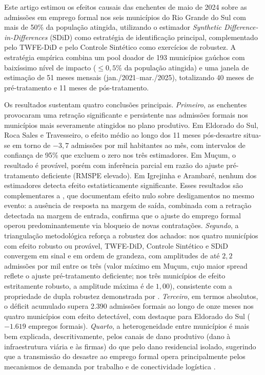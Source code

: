 \documentclass[a4paper,12pt]{article}
\begin{document}
Este artigo estimou os efeitos causais das enchentes de maio de 2024 sobre as admissões
em emprego formal nos seis municípios do Rio Grande do Sul com mais de 50\% da
população atingida, utilizando o estimador \textit{Synthetic Difference-in-Differences}
(SDiD) como estratégia de identificação principal, complementado pelo TWFE-DiD e pelo
Controle Sintético como exercícios de robustez. A estratégia empírica combina um pool
doador de 193 municípios gaúchos com baixíssimo nível de impacto ($\leq 0{,}5\%$ da
população atingida) e uma janela de estimação de 51 meses mensais (jan./2021–mar./2025),
totalizando 40 meses de pré-tratamento e 11 meses de pós-tratamento.

Os resultados sustentam quatro conclusões principais. \emph{Primeiro}, as enchentes
provocaram uma retração significante e persistente nas admissões formais nos municípios
mais severamente atingidos no plano produtivo. Em Eldorado do Sul, Roca Sales e
Travesseiro, o efeito médio ao longo dos 11 meses pós-desastre situa-se em torno de
$-3{,}7$ admissões por mil habitantes ao mês, com intervalos de confiança de 95\% que
excluem o zero nos três estimadores. Em Muçum, o resultado é provável, porém com
inferência parcial em razão do ajuste pré-tratamento deficiente (RMSPE elevado). Em
Igrejinha e Arambaré, nenhum dos estimadores detecta efeito estatisticamente significante.
Esses resultados são complementares a , que documentam efeito
nulo sobre desligamentos no mesmo evento: a ausência de resposta na margem de saída,
combinada com a retração detectada na margem de entrada, confirma que o ajuste do
emprego formal operou predominantemente via bloqueio de novas contratações.
\emph{Segundo}, a triangulação metodológica reforça a robustez dos achados: nos quatro
municípios com efeito robusto ou provável, TWFE-DiD, Controle Sintético e SDiD convergem
em sinal e em ordem de grandeza, com amplitudes de até $2{,}2$ admissões por mil entre os três
(valor máximo em Muçum, cujo maior spread reflete o ajuste pré-tratamento
deficiente; nos três municípios de efeito estritamente robusto, a amplitude
máxima é de $1{,}00$), consistente com a propriedade de dupla robustez
demonstrada por . \emph{Terceiro}, em termos absolutos, o déficit acumulado
supera 2.390 admissões formais ao longo de onze meses nos quatro municípios com efeito
detectável, com destaque para Eldorado do Sul ($-1.619$ empregos formais). \emph{Quarto},
a heterogeneidade entre municípios é mais bem explicada, descritivamente, pelos canais de
dano produtivo (dano à infraestrutura viária e às firmas) do que pelo dano residencial
isolado, sugerindo que a transmissão do desastre ao emprego formal opera principalmente
pelos mecanismos de demanda por trabalho \cite{haddad2015economic} e de conectividade
logística \cite{xiao2014}.
\end{document}
